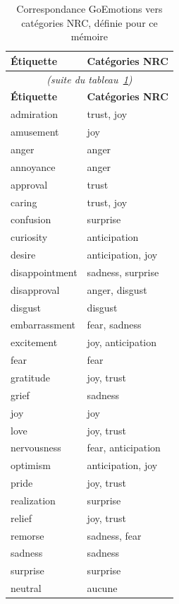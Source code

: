 {\small
\renewcommand{\arraystretch}{1.15}
\begin{longtable}{|l|l|}
\caption{Correspondance GoEmotions vers catégories NRC, définie pour ce mémoire}
\label{tab:nrc-goemotions} \\
\hline
\textbf{Étiquette} & \textbf{Catégories NRC} \\
\hline
\endfirsthead
\multicolumn{2}{|c|}{\emph{(suite du tableau~\ref{tab:nrc-goemotions})}} \\
\hline
\textbf{Étiquette} & \textbf{Catégories NRC} \\
\hline
\endhead
\hline
\endfoot
\hline
\endlastfoot
admiration & trust, joy \\
\hline
amusement & joy \\
\hline
anger & anger \\
\hline
annoyance & anger \\
\hline
approval & trust \\
\hline
caring & trust, joy \\
\hline
confusion & surprise \\
\hline
curiosity & anticipation \\
\hline
desire & anticipation, joy \\
\hline
disappointment & sadness, surprise \\
\hline
disapproval & anger, disgust \\
\hline
disgust & disgust \\
\hline
embarrassment & fear, sadness \\
\hline
excitement & joy, anticipation \\
\hline
fear & fear \\
\hline
gratitude & joy, trust \\
\hline
grief & sadness \\
\hline
joy & joy \\
\hline
love & joy, trust \\
\hline
nervousness & fear, anticipation \\
\hline
optimism & anticipation, joy \\
\hline
pride & joy, trust \\
\hline
realization & surprise \\
\hline
relief & joy, trust \\
\hline
remorse & sadness, fear \\
\hline
sadness & sadness \\
\hline
surprise & surprise \\
\hline
neutral & aucune \\
\hline
\end{longtable}
}

